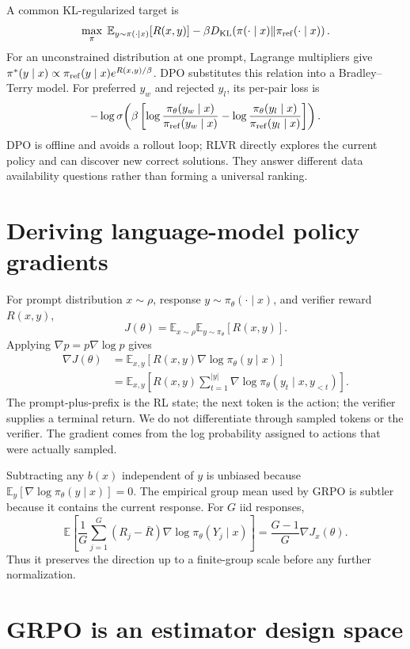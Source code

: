 \documentclass[11pt]{article}
\newcommand{\E}{\mathbb{E}}
\newcommand{\KL}{D_{\mathrm{KL}}}
\begin{document}
A common KL-regularized target is
\[
\max_\pi\;\E_{y\sim\pi(\cdot\mid x)}[R(x,y)]
-\beta\KL\!\left(\pi(\cdot\mid x)\|\pi_{\rm ref}(\cdot\mid x)\right).
\]
For an unconstrained distribution at one prompt, Lagrange multipliers give
$\pi^*(y\mid x)\propto\pi_{\rm ref}(y\mid x)e^{R(x,y)/\beta}$.  DPO substitutes
this relation into a Bradley--Terry model.  For preferred $y_w$ and rejected
$y_l$, its per-pair loss is
\[
-\log\sigma\!\left(\beta\left[
\log\frac{\pi_\theta(y_w\mid x)}{\pi_{\rm ref}(y_w\mid x)}-
\log\frac{\pi_\theta(y_l\mid x)}{\pi_{\rm ref}(y_l\mid x)}
\right]\right).
\]
DPO is offline and avoids a rollout loop; RLVR directly explores the current
policy and can discover new correct solutions.  They answer different data
availability questions rather than forming a universal ranking.

\section{Deriving language-model policy gradients}

For prompt distribution $x\sim\rho$, response $y\sim\pi_\theta(\cdot\mid x)$,
and verifier reward $R(x,y)$,
\[
J(\theta)=\E_{x\sim\rho}\E_{y\sim\pi_\theta}[R(x,y)].
\]
Applying $\nabla p=p\nabla\log p$ gives
\begin{align}
\nabla J(\theta)
&=\E_{x,y}[R(x,y)\nabla\log\pi_\theta(y\mid x)]\\
&=\E_{x,y}\left[R(x,y)\sum_{t=1}^{|y|}
\nabla\log\pi_\theta(y_t\mid x,y_{<t})\right].
\end{align}
The prompt-plus-prefix is the RL state; the next token is the action; the
verifier supplies a terminal return.  We do not differentiate through sampled
tokens or the verifier.  The gradient comes from the log probability assigned
to actions that were actually sampled.

Subtracting any $b(x)$ independent of $y$ is unbiased because
$\E_y[\nabla\log\pi_\theta(y\mid x)]=0$.  The empirical group mean used by GRPO
is subtler because it contains the current response.  For $G$ iid responses,
\[
\E\left[\frac1G\sum_{j=1}^G(R_j-\bar R)
\nabla\log\pi_\theta(Y_j\mid x)\right]
=\frac{G-1}{G}\nabla J_x(\theta).
\]
Thus it preserves the direction up to a finite-group scale before any further
normalization.

\section{GRPO is an estimator design space}
\end{document}
